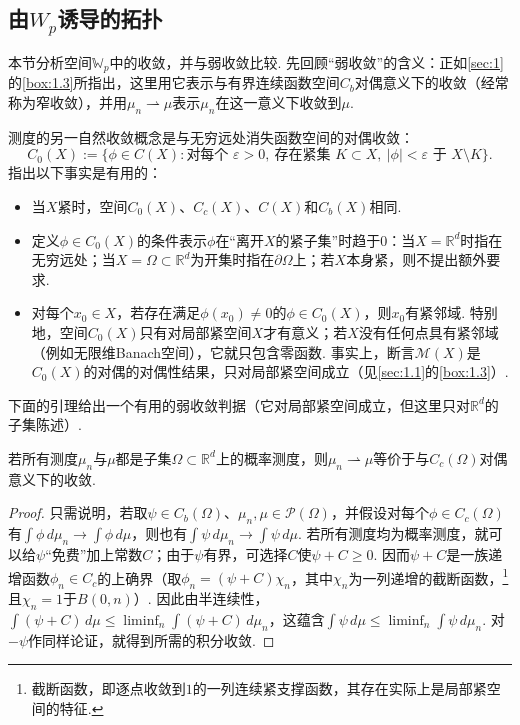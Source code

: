 \subsection[Wasserstein距离诱导的拓扑]{由$W_p$诱导的拓扑}\label{sec:5.2}

本节分析空间$\mathbb W_p$中的收敛，并与弱收敛比较. 先回顾“弱收敛”的含义：正如\autoref{sec:1}的\autoref{box:1.3}所指出，这里用它表示与有界连续函数空间$C_b$对偶意义下的收敛（经常称为窄收敛），并用$\mu_n\rightharpoonup\mu$表示$\mu_n$在这一意义下收敛到$\mu$.

测度的另一自然收敛概念是与无穷远处消失函数空间的对偶收敛：
\[
C_0(X):=\{\phi\in C(X):\text{对每个 }\varepsilon>0,\ \text{存在紧集 }K\subset X,
\ |\phi|<\varepsilon\text{ 于 }X\setminus K\}.
\]
指出以下事实是有用的：
\begin{itemize}
\item 当$X$紧时，空间$C_0(X)$、$C_c(X)$、$C(X)$和$C_b(X)$相同.
\item 定义$\phi\in C_0(X)$的条件表示$\phi$在“离开$X$的紧子集”时趋于$0$：当$X=\mathbb R^d$时指在无穷远处；当$X=\Omega\subset\mathbb R^d$为开集时指在$\partial\Omega$上；若$X$本身紧，则不提出额外要求.
\item{}\label{idx:root5-p184-localcompact} 对每个$x_0\in X$，若存在满足$\phi(x_0)\ne0$的$\phi\in C_0(X)$，则$x_0$有紧邻域. 特别地，空间$C_0(X)$只有对局部紧空间$X$才有意义；若$X$没有任何点具有紧邻域（例如无限维Banach空间），它就只包含零函数. 事实上，断言$\mathscr M(X)$是$C_0(X)$的对偶的对偶性结果，只对局部紧空间成立（见\autoref{sec:1.1}的\autoref{box:1.3}）.
\end{itemize}

下面的引理给出一个有用的弱收敛判据（它对局部紧空间成立，但这里只对$\mathbb R^d$的子集陈述）.

\begin{lemma}\label{obj:5.8}
若所有测度$\mu_n$与$\mu$都是子集$\Omega\subset\mathbb R^d$上的概率测度，则$\mu_n\rightharpoonup\mu$等价于与$C_c(\Omega)$对偶意义下的收敛.
\end{lemma}
\begin{proof}
只需说明，若取$\psi\in C_b(\Omega)$、$\mu_n,\mu\in\mathscr P(\Omega)$，并假设对每个$\phi\in C_c(\Omega)$有$\int\phi\,d\mu_n\to\int\phi\,d\mu$，则也有$\int\psi\,d\mu_n\to\int\psi\,d\mu$. 若所有测度均为概率测度，就可以给$\psi$“免费”加上常数$C$；由于$\psi$有界，可选择$C$使$\psi+C\ge0$. 因而$\psi+C$是一族递增函数$\phi_n\in C_c$的上确界（取$\phi_n=(\psi+C)\chi_n$，其中$\chi_n$为一列递增的截断函数，\footnote{截断函数，即逐点收敛到$1$的一列连续紧支撑函数，其存在实际上是局部紧空间的特征.}且$\chi_n=1$于$B(0,n)$）. 因此由半连续性，
$\int(\psi+C)\,d\mu\le\liminf_n\int(\psi+C)\,d\mu_n$，这蕴含$\int\psi\,d\mu\le\liminf_n\int\psi\,d\mu_n$. 对$-\psi$作同样论证，就得到所需的积分收敛.
\end{proof}

